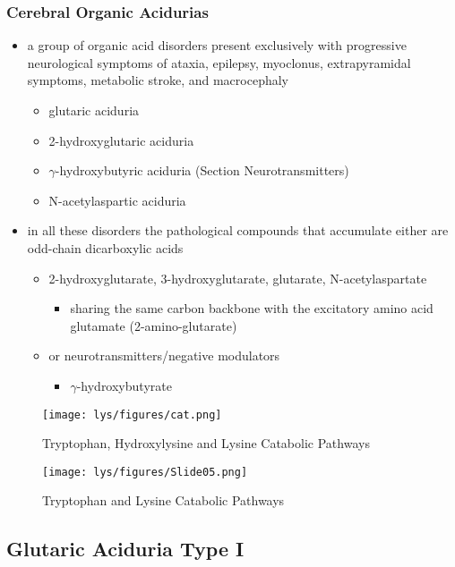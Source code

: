 \documentclass[12pt]{scrartcl}
\begin{document}
\begin{center}
\begin{center}
\subsubsection{Cerebral Organic Acidurias}
\label{sec:org43fcf9c}
\begin{itemize}
\item a group of organic acid disorders present exclusively with
progressive neurological symptoms of ataxia, epilepsy, myoclonus,
extrapyramidal symptoms, metabolic stroke, and macrocephaly
\begin{itemize}
\item glutaric aciduria
\item 2-hydroxyglutaric aciduria
\item \(\gamma\)-hydroxybutyric aciduria (Section Neurotransmitters)
\item N-acetylaspartic aciduria
\end{itemize}
\item in all these disorders the pathological compounds that accumulate
either are odd-chain dicarboxylic acids
\begin{itemize}
\item 2-hydroxyglutarate, 3-hydroxyglutarate, glutarate, N-acetylaspartate
\begin{itemize}
\item sharing the same carbon backbone with the excitatory amino acid
glutamate (2-amino-glutarate)
\end{itemize}
\item or neurotransmitters/negative modulators
\begin{itemize}
\item \(\gamma\)-hydroxybutyrate
\end{itemize}
\end{itemize}
\end{itemize}

\begin{figure}[htbp]
\centering
\texttt{[image: lys/figures/cat.png]}
\caption{\label{fig:org695c299}Tryptophan, Hydroxylysine and Lysine Catabolic Pathways}
\end{figure}


\begin{figure}[htbp]
\centering
\texttt{[image: lys/figures/Slide05.png]}
\caption{\label{fig:org70af500}Tryptophan and Lysine Catabolic Pathways}
\end{figure}

\subsection{Glutaric Aciduria Type I}
\label{sec:orgfc8031a}

\end{center}
\end{center}
\end{document}

